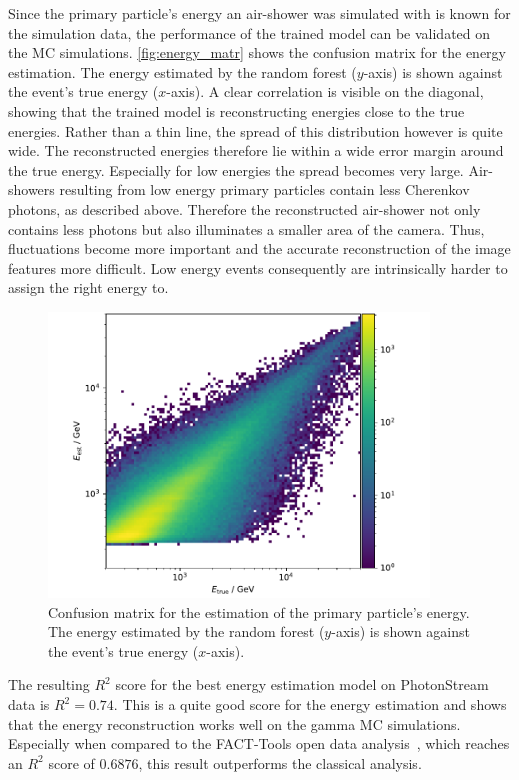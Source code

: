 Since the primary particle's energy an air-shower was simulated with is known
for the simulation data, the performance of the trained model can be
validated on the MC simulations. \autoref{fig:energy_matr} shows the confusion
matrix for the energy estimation. The energy estimated by the random forest
($y$-axis) is shown against the event's true energy ($x$-axis). A clear
correlation is visible on the diagonal, showing that the trained model is
reconstructing energies close to the true energies. Rather than a thin line,
the spread of this distribution however is quite wide. The reconstructed
energies therefore lie within a wide error margin around the true energy.
Especially for low energies the spread becomes very large. Air-showers
resulting from low energy primary particles contain less Cherenkov photons, as
described above. Therefore the reconstructed air-shower not only contains less
photons but also illuminates a smaller area of the camera. Thus, fluctuations
become more important and the accurate reconstruction of the image features more
difficult. Low energy events consequently are intrinsically harder to assign
the right energy to.
%
\begin{figure}
  \centering
  \includegraphics[width=0.9\textwidth]{Plots/results/DBSCAN/energy_migration.pdf}
  \caption{Confusion matrix for the estimation of the primary particle's energy. The energy estimated by the random forest ($y$-axis) is shown against the event's true energy ($x$-axis).}
  \label{fig:energy_matr}
\end{figure}
%
The resulting $R^2$ score for the best energy estimation model on PhotonStream
data is $R^2 = 0.74$. This is a quite good score for the energy estimation and
shows that the energy reconstruction works well on the gamma MC simulations.
Especially when compared to the FACT-Tools open data analysis~\cite{openana},
which reaches an $R^2$ score of $0.6876$, this result outperforms the
classical analysis.
%


